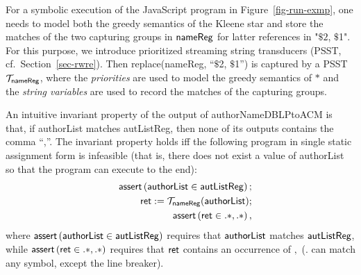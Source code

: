 For a symbolic execution of the JavaScript program in Figure~\ref{fig-run-exmp}, one needs to model both the greedy semantics of the Kleene star and store the matches of the two capturing groups in ${\sf nameReg}$ for latter references in "$\$2$, $\$$1". For this purpose, we introduce prioritized streaming string transducers (PSST, cf.\ Section~\ref{sec-rwre}). Then {\sf replace(nameReg, ``$\$$2, $\$$1'')} is captured by a PSST $\mathcal{T}_{\sf nameReg}$, where the \emph{priorities} are used to model the greedy semantics of $*$ and the \emph{string variables} are used to record the matches of the capturing groups.


An intuitive invariant property of the output of {\sf authorNameDBLPtoACM} is that, if {\sf authorList} matches {\sf autListReg}, then none of its outputs contains the comma ``,''. The invariant property holds iff the following program in single static assignment form is infeasible (that is, there does not exist a value of {\sf authorList} so that the program can execute to the end):
%
\begin{eqnarray}\label{eqn:exmp}
& & \textsf{assert}\left(\sf authorList \in autListReg\right);\nonumber \\
& & \sf ret  := \sf  \mathcal{T}_{nameReg}(authorList);\nonumber \\
& &  \textsf{assert}\left(\sf ret \in .*,.*\right),
\end{eqnarray}
%
where $\textsf{assert}\left(\sf authorList \in autListReg\right)$ requires that $\sf authorList$ matches $\sf autListReg$, while $\textsf{assert}\left(\sf ret \in .*,.*\right)$ requires that $\sf ret$ contains an occurrence of $,$ ($.$ can match any symbol, except the line breaker).

